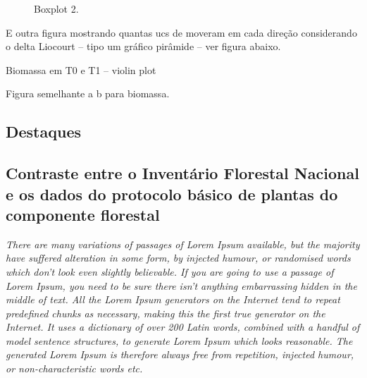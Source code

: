 \documentclass[
  letterpaper,
]{scrbook}
\begin{document}
\begin{figure}[H]


\caption{\label{fig-violino1}Boxplot 2.}

\end{figure}%

E outra figura mostrando quantas ucs de moveram em cada direção
considerando o delta Liocourt -- tipo um gráfico pirâmide -- ver figura
abaixo.

Biomassa em T0 e T1 -- violin plot

Figura semelhante a b para biomassa.

\subsection{Destaques}\label{destaques}

\subsection{Contraste entre o Inventário Florestal Nacional e os dados
do protocolo básico de plantas do componente
florestal}\label{contraste-entre-o-inventuxe1rio-florestal-nacional-e-os-dados-do-protocolo-buxe1sico-de-plantas-do-componente-florestal}

\emph{There are many variations of passages of Lorem Ipsum available,
but the majority have suffered alteration in some form, by injected
humour, or randomised words which don't look even slightly believable.
If you are going to use a passage of Lorem Ipsum, you need to be sure
there isn't anything embarrassing hidden in the middle of text. All the
Lorem Ipsum generators on the Internet tend to repeat predefined chunks
as necessary, making this the first true generator on the Internet. It
uses a dictionary of over 200 Latin words, combined with a handful of
model sentence structures, to generate Lorem Ipsum which looks
reasonable. The generated Lorem Ipsum is therefore always free from
repetition, injected humour, or non-characteristic words etc.}
\end{document}
